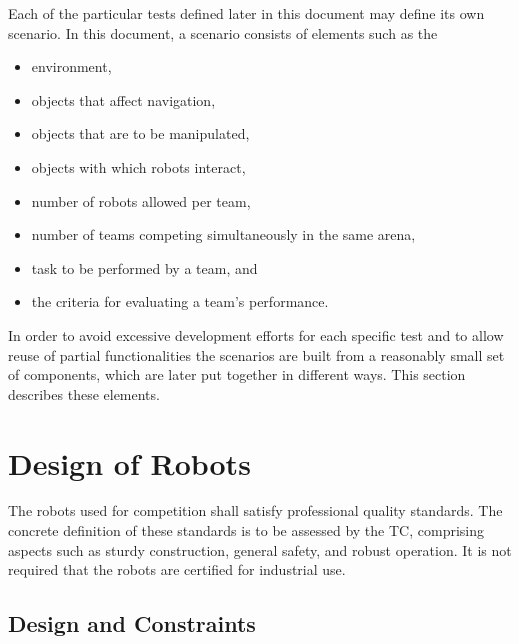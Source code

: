 
Each of the particular tests defined later in this document may define its own scenario. In this document, a scenario consists of elements such as the

\begin{itemize}
	\item environment,
	\item objects that affect navigation,
	\item objects that are to be manipulated,
	\item objects with which robots interact,
	\item number of robots allowed per team,
	\item number of teams competing simultaneously in the same arena,
	\item task to be performed by a team, and
	\item the criteria for evaluating a team's performance.
\end{itemize}

In order to avoid excessive development efforts for each specific test and to allow reuse of partial functionalities the scenarios are built from a reasonably small set of components, which are later put together in different ways. This section describes these elements.

\section{Design of Robots}
The robots used for competition shall satisfy professional quality standards. The concrete definition of these standards is to be assessed by the TC, comprising aspects such as sturdy construction, general safety, and robust operation. It is not required that the robots are certified for industrial use.

\subsection{Design and Constraints} \label{ssec:RobotDesignAndConstraints}

